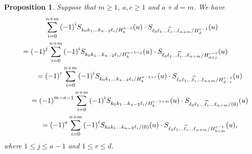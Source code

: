 \documentclass[pdftex]{sigma}
\numberwithin{equation}{section}
\newtheorem{Proposition}[Theorem]{Proposition}
 { \theoremstyle{definition}
\newtheorem{Definition}[Theorem]{Definition}
\newtheorem{Note}[Theorem]{Note}
\newtheorem{Example}[Theorem]{Example}
\newtheorem{Remark}[Theorem]{Remark} }
\begin{document}
\begin{Proposition}\label{mabcd}
Suppose that $m\geq 1$, $a,c\geq 1$ and $a+d=m$. We have
\begin{gather}
\sum_{i=0}^{n+m}{(-1)}^{i}S_{k_0 k_1\dots k_{n-2}\ell_i/{H^{a-1}_{b}}}(u)\cdot S_{\ell_0 \ell_1\dots \widehat{\ell_{i}}\dots\ell_{n+m}/{H^{c-1}_{d}}}(u)\label{mabcd0}\\
\qquad{}={(-1)}^{j}\sum_{i=0}^{n+m}{(-1)}^{i}S_{k_0 k_1\dots k_{n-2}\ell_i/{H^{a-1-j}_{b}}}(u)\cdot S_{\ell_0 \ell_1\dots \widehat{\ell_{i}}\dots\ell_{n+m}/{H^{c-1}_{d+j}}}(u)\hspace{0.5cm}\ \ \ \ \ \ \ \ \label{mabcd1}\\
\qquad{}={(-1)}^{r}\sum_{i=0}^{n+m}{(-1)}^{i}S_{k_0 k_1\dots k_{n-2}\ell_i/{H^{a-1+r}_{b}}}(u)\cdot S_{\ell_0 \ell_1\dots \widehat{\ell_{i}}\dots\ell_{n+m}/{H^{c-1}_{d-r}}}(u) \label{mabcd2}\\
\qquad{}={(-1)}^{m-a-1}\sum_{i=0}^{n+m}{(-1)}^{i}S_{k_0 k_1\dots k_{n-2}\ell_i/{H^{c-1+m}_{b}}}(u)\cdot S_{\ell_0 \ell_1\dots \widehat{\ell_{i}}\dots\ell_{n+m}/{(0)}}(u)
\label{mabcd3}\\
\qquad{}={(-1)}^{a}\sum_{i=0}^{n+m}{(-1)}^{i}S_{k_0 k_1\dots k_{n-2}\ell_i/{(0)}}(u)\cdot S_{\ell_0 \ell_1\dots \widehat{\ell_{i}}\dots\ell_{n+m}/{H^{c-1}_{b+m}}}(u),
\label{mabcd4}
\end{gather}
where $1\leq j \leq a-1$ and $1\leq r\leq d$.
\end{Proposition}
\end{document}
